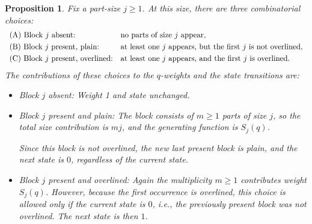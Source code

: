 \documentclass[letterpaper,12pt]{article}
\newtheorem{proposition}{Proposition}
\begin{document}
\begin{proposition}\label{prop:transition}
Fix a part-size \(j\ge1\). At this size, there are three combinatorial choices:
\[
\begin{array}{ll}
\text{\textup{(A)} Block $j$ absent:} &
\text{no parts of size } j \text{ appear},\\[3pt]
\text{\textup{(B)} Block $j$ present, plain:} &
\text{at least one } j \text{ appears, but the first $j$ is not overlined},\\[3pt]
\text{\textup{(C)} Block $j$ present, overlined:} &
\text{at least one } j \text{ appears, and the first $j$ is overlined}.
\end{array}
\]
The contributions of these choices to the \(q\)-weights and the state transitions
are:
\begin{itemize}
  \item[(A)] Block $j$ absent: Weight 1  and  state unchanged.
  \item[(B)] Block $j$ present and plain:  
  The block consists of \(m\ge1\) parts of size \(j\),
  so the total size contribution is \(mj\), and the generating function is $S_j(q)$. 
  
  Since this block is \emph{not} overlined, the new last present block is plain,
  and the next state is \(0\), regardless of the current state.
  \item[(C)] Block $j$ present and  overlined: 
  Again the multiplicity \(m\ge1\) contributes weight \(S_j(q)\).
  However, because the first occurrence is overlined, this choice is allowed
  only if the current state is \(0\), i.e., the previously present block was
  not overlined. The next state is then \(1\).
\end{itemize}
\end{proposition}
\end{document}
